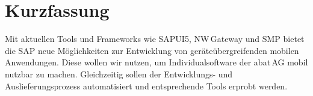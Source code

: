 
\chapter{Kurzfassung}

Mit aktuellen Tools und Frameworks wie SAPUI5, NW\,Gateway und SMP bietet die
SAP neue Möglichkeiten zur Entwicklung von geräteübergreifenden mobilen
Anwendungen. Diese wollen wir nutzen, um Individualsoftware der abat\,AG mobil
nutzbar zu machen. Gleichzeitig sollen der Entwicklungs- und
Auslieferungsprozess automatisiert und entsprechende Tools erprobt werden.
